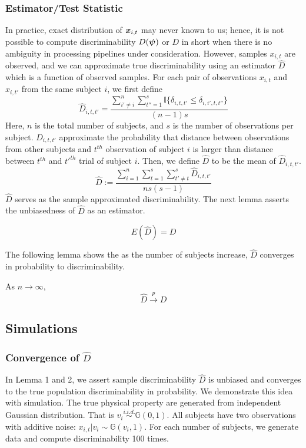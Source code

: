 \documentclass{article}
\begin{document}
\subsubsection{Estimator/Test Statistic}
In practice, exact distribution of $\boldsymbol{x}_{i,t}$ may never known to us; hence, it is not possible to compute discriminability $D(\boldsymbol{\psi})$ or $D$ in short when there is no ambiguity in processing pipelines under consideration. However, samples $x_{i,t}$ are observed, and we can approximate true discriminability using an estimator $\hat{D}$ which is a function of observed samples. For each pair of observations $x_{i,t}$ and $x_{i,t'}$ from the same subject $i$, we first define
\[ \hat{D}_{i,t,t'} = \frac{\sum\limits_{i' \neq i}^{n} \sum\limits_{t''=1}^{s} \mathbb{I}\{\delta_{i,t,t'} \leq \delta_{i,i',t,t''} \} }{(n-1)s}\]
Here, $n$ is the total number of subjects, and $s$ is the number of observations per subject. $\hat{D}_{i,t,t'}$ approximate the probability that distance between observations from other subjects and $t^{th}$ observation of subject $i$ is larger than distance between $t^{th}$ and $t'^{th}$ trial of subject $i$. Then, we define $\hat{D}$ to be the mean of $\hat{D}_{i,t,t'}$.
\[ \hat{D} := \frac{\sum\limits_{i=1}^{n} \sum\limits_{t=1}^{s}  \sum\limits_{t' \neq t}^{s} \hat{D}_{i,t,t'}}{ns(s-1)} \]
$\hat{D}$ serves as the sample approximated discriminability. The next lemma asserts the unbiasedness of $\hat{D}$ as an estimator.

\begin{lem}	
	\[ E(\hat{D}) = D\]
\end{lem}

The following lemma shows the as the number of subjects increase, $\hat{D}$ converges in probability to discriminability.
\begin{lem}	
As $n \rightarrow \infty$,
\[\hat{D} \overset{p}{\rightarrow} D \]
\end{lem}

\subsection{Simulations}

\subsubsection{Convergence of $\hat{D}$}
In Lemma 1 and 2, we assert sample discriminability $\hat{D}$ is unbiased and converges to  the true population discriminability in probability. We demonstrate this idea with simulation. The true physical property are generated from independent Gaussian distribution. That is $v_i \overset{i.i.d.}{\sim} \mathbb{G}(0,1)$. All subjects have two observations with additive noise: $x_{i,t} | v_i \sim \mathbb{G}(v_i,1)$. For each number of subjects, we generate data and compute discriminability 100 times. 
\end{document}
